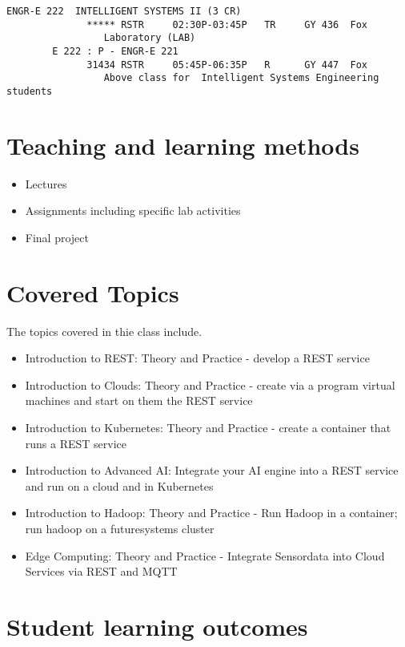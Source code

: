 \begin{verbatim}
ENGR-E 222  INTELLIGENT SYSTEMS II (3 CR)
              ***** RSTR     02:30P-03:45P   TR     GY 436  Fox
                 Laboratory (LAB)
        E 222 : P - ENGR-E 221
              31434 RSTR     05:45P-06:35P   R      GY 447  Fox
                 Above class for  Intelligent Systems Engineering students

\end{verbatim}        


\section{Teaching and learning methods}


\begin{itemize}
\item Lectures
\item Assignments including specific lab activities
\item Final project 
\end{itemize}

\section{Covered Topics}

The topics covered in thie class include.

\begin{itemize}
\item Introduction to REST: Theory and Practice - develop a REST service
\item Introduction to Clouds: Theory and Practice - create via a
  program virtual machines and start on them the REST service
\item Introduction to Kubernetes: Theory and Practice - create a
  container that runs a REST service
\item Introduction to Advanced AI: Integrate your AI engine into a
  REST service and run on a cloud and in Kubernetes 
\item Introduction to Hadoop: Theory and Practice - Run Hadoop in a
  container; run hadoop on a futuresystems cluster
\item Edge Computing: Theory and Practice - Integrate Sensordata into
  Cloud Services via REST and MQTT
\end{itemize}


\section{Student learning outcomes}

